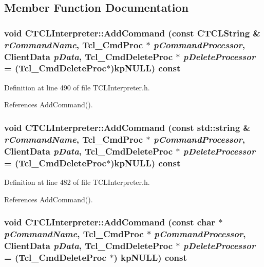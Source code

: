 \subsection{Member Function Documentation}
\subsubsection{\setlength{\rightskip}{0pt plus 5cm}void CTCLInterpreter::Add\-Command (const {\bf CTCLString} \& {\em r\-Command\-Name}, Tcl\_\-Cmd\-Proc $\ast$ {\em p\-Command\-Processor}, Client\-Data {\em p\-Data}, Tcl\_\-Cmd\-Delete\-Proc $\ast$ {\em p\-Delete\-Processor} = (Tcl\_\-Cmd\-Delete\-Proc$\ast$){\bf kp\-NULL}) const\hspace{0.3cm}{\tt  [inline]}}\label{classCTCLInterpreter_a38}




Definition at line 490 of file TCLInterpreter.h.

References Add\-Command().
\subsubsection{\setlength{\rightskip}{0pt plus 5cm}void CTCLInterpreter::Add\-Command (const std::string \& {\em r\-Command\-Name}, Tcl\_\-Cmd\-Proc $\ast$ {\em p\-Command\-Processor}, Client\-Data {\em p\-Data}, Tcl\_\-Cmd\-Delete\-Proc $\ast$ {\em p\-Delete\-Processor} = (Tcl\_\-Cmd\-Delete\-Proc$\ast$){\bf kp\-NULL}) const\hspace{0.3cm}{\tt  [inline]}}\label{classCTCLInterpreter_a37}




Definition at line 482 of file TCLInterpreter.h.

References Add\-Command().
\subsubsection{\setlength{\rightskip}{0pt plus 5cm}void CTCLInterpreter::Add\-Command (const char $\ast$ {\em p\-Command\-Name}, Tcl\_\-Cmd\-Proc $\ast$ {\em p\-Command\-Processor}, Client\-Data {\em p\-Data}, Tcl\_\-Cmd\-Delete\-Proc $\ast$ {\em p\-Delete\-Processor} = (Tcl\_\-Cmd\-Delete\-Proc $\ast$) {\bf kp\-NULL}) const}\label{classCTCLInterpreter_a36}




